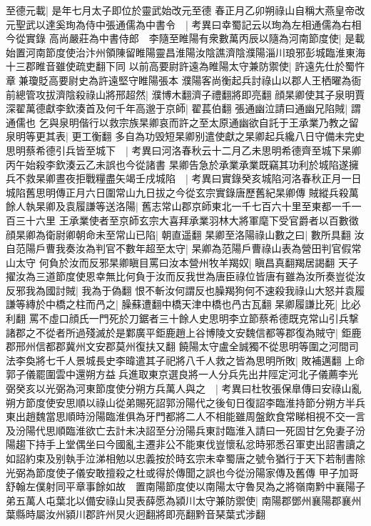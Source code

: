 至德元載|{
	是年七月太子即位於靈武始改元至德}
春正月乙卯朔祿山自稱大燕皇帝改元聖武以達奚珣為侍中張通儒為中書令　|{
	考異曰幸蜀記云以珣為左相通儒為右相今從實錄}
高尚嚴莊為中書侍郎　李隨至睢陽有衆數萬丙辰以隨為河南節度使|{
	是載始置河南節度使治汴州領陳留睢陽靈昌淮陽汝陰譙濟陰濮陽淄川琅邪彭城臨淮東海十三郡睢音雖使疏吏翻下同}
以前高要尉許遠為睢陽太守兼防禦使|{
	許遠先仕於蜀忤章兼瓊貶高要尉史為許遠堅守睢陽張本}
濮陽客尚衡起兵討祿山以郡人王栖曜為衙前總管攻拔濟陰殺祿山將邢超然|{
	濮博木翻濟子禮翻將即亮翻}
顔杲卿使其子泉明賈深翟萬德獻李欽湊首及何千年高邈于京師|{
	翟萇伯翻}
張通幽泣請曰通幽兄陷賊|{
	謂通儒也}
乞與泉明偕行以救宗族杲卿哀而許之至太原通幽欲自託于王承業乃教之留泉明等更其表|{
	更工衡翻}
多自為功毁短杲卿别遣使獻之杲卿起兵纔八日守備未完史思明蔡希德引兵皆至城下　|{
	考異曰河洛春秋云十二月乙未思明希德齊至城下杲卿丙午始殺李欽湊云乙未誤也今從諸書}
杲卿告急於承業承業既竊其功利於城陷遂擁兵不救杲卿晝夜拒戰糧盡矢竭壬戌城陷　|{
	考異曰實錄癸亥城陷河洛春秋正月一日城陷舊思明傳正月六日圍常山九日拔之今從玄宗實錄唐歷舊紀杲卿傳}
賊縱兵殺萬餘人執杲卿及袁履謙等送洛陽|{
	舊志常山郡京師東北一千七百六十里至東都一千一百三十六里}
王承業使者至京師玄宗大喜拜承業羽林大將軍麾下受官爵者以百數徵顔杲卿為衛尉卿朝命未至常山已陷|{
	朝直遥翻}
杲卿至洛陽祿山數之曰|{
	數所具翻}
汝自范陽戶曹我奏汝為判官不數年超至太守|{
	杲卿為范陽戶曹祿山表為營田判官假常山太守}
何負於汝而反邪杲卿瞋目罵曰汝本營州牧羊羯奴|{
	瞋昌真翻羯居謁翻}
天子擢汝為三道節度使恩幸無比何負于汝而反我世為唐臣祿位皆唐有雖為汝所奏豈從汝反邪我為國討賊|{
	我為于偽翻}
恨不斬汝何謂反也臊羯狗何不速殺我祿山大怒并袁履謙等縳於中橋之柱而冎之|{
	臊蘇遭翻中橋天津中橋也冎古瓦翻}
杲卿履謙比死|{
	比必利翻}
罵不虛口顔氏一門死於刀鋸者三十餘人史思明李立節蔡希德既克常山引兵撃諸郡之不從者所過殘滅於是鄴廣平鉅鹿趙上谷博陵文安魏信都等郡復為賊守|{
	鉅鹿郡邢州信都郡冀州文安郡莫州復扶又翻}
饒陽太守盧全誠獨不從思明等圍之河間司法李奐將七千人景城長史李暐遣其子祀將八千人救之皆為思明所敗|{
	敗補邁翻}
上命郭子儀罷圍雲中還朔方益兵進取東京選良將一人分兵先出井陘定河北子儀薦李光弼癸亥以光弼為河東節度使分朔方兵萬人與之　|{
	考異曰杜牧張保臯傳曰安祿山亂朔方節度使安思順以祿山從弟賜死詔郭汾陽代之後旬日復詔李臨淮持節分朔方半兵東出趙魏當思順時汾陽臨淮俱為牙門都將二人不相能雖周盤飲食常睇相視不交一言及汾陽代思順臨淮欲亡去計未决詔至分汾陽兵東討臨淮入請曰一死固甘乞免妻子汾陽趨下持手上堂偶坐曰今國亂主遷非公不能東伐豈懷私忿時邪悉召軍吏出詔書讀之如詔約束及别執手泣涕相勉以忠義按於時玄宗未幸蜀唐之號令猶行于天下若制書除光弼為節度使子儀安敢擅殺之杜或得於傳聞之誤也今從汾陽家傳及舊傳}
甲子加哥舒翰左僕射同平章事餘如故　置南陽節度使以南陽太守魯炅為之將嶺南黔中襄陽子弟五萬人屯葉北以備安祿山炅表薛愿為潁川太守兼防禦使|{
	南陽郡鄧州襄陽郡襄州葉縣時屬汝州潁川郡許州炅火迥翻將即亮翻黔音琹葉式涉翻}
